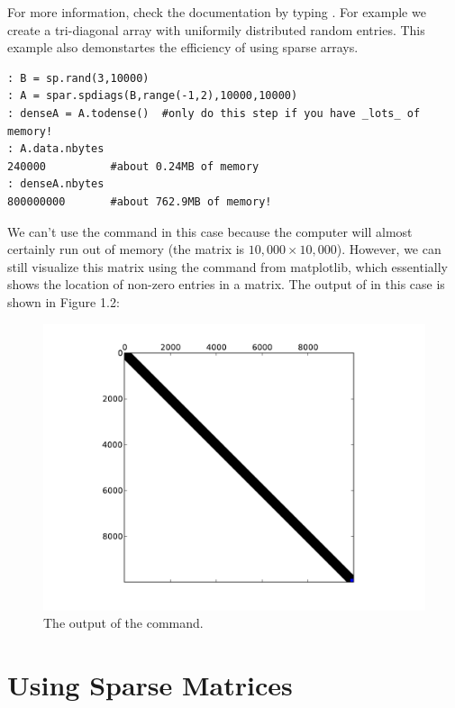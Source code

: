 For more information, check the documentation by typing . For example we create a tri-diagonal array with uniformily distributed random entries.  This example also demonstartes the efficiency of using sparse arrays.
\begin{lstlisting}
: B = sp.rand(3,10000)
: A = spar.spdiags(B,range(-1,2),10000,10000)
: denseA = A.todense()  #only do this step if you have _lots_ of memory!
: A.data.nbytes
240000          #about 0.24MB of memory
: denseA.nbytes
800000000       #about 762.9MB of memory!
\end{lstlisting}


We can't use the  command in this case because the computer will almost certainly run out of memory (the matrix is $10,\!000 \times 10,\!000$). However, we can still visualize this matrix using the  command from matplotlib, which essentially shows the location of non-zero entries in a matrix. The output of  in this case is shown in Figure 1.2:

\begin{figure}[h!]
\begin{center}
\includegraphics[scale = .5]{./Figures/spy}
\end{center}
\caption{The output of the  command.}
\end{figure}

\section*{Using Sparse Matrices}

